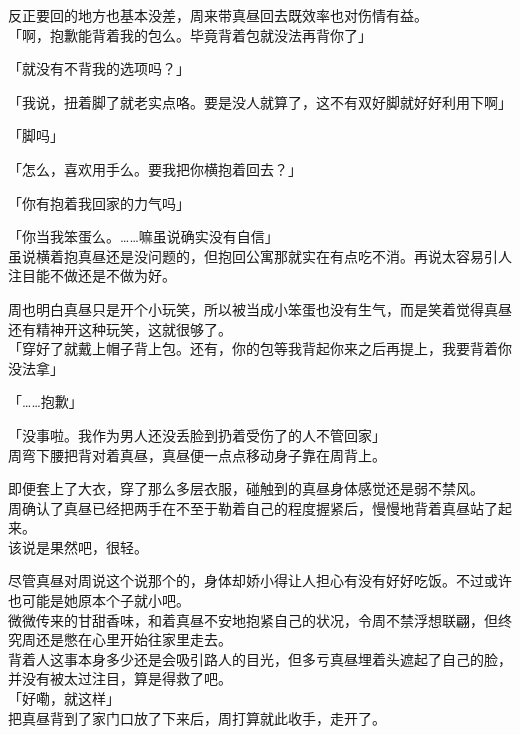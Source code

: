 反正要回的地方也基本没差，周来带真昼回去既效率也对伤情有益。\\

「啊，抱歉能背着我的包么。毕竟背着包就没法再背你了」

「就没有不背我的选项吗？」

「我说，扭着脚了就老实点咯。要是没人就算了，这不有双好脚就好好利用下啊」

「脚吗」

「怎么，喜欢用手么。要我把你横抱着回去？」

「你有抱着我回家的力气吗」

「你当我笨蛋么。……嘛虽说确实没有自信」\\

虽说横着抱真昼还是没问题的，但抱回公寓那就实在有点吃不消。再说太容易引人注目能不做还是不做为好。

周也明白真昼只是开个小玩笑，所以被当成小笨蛋也没有生气，而是笑着觉得真昼还有精神开这种玩笑，这就很够了。\\

「穿好了就戴上帽子背上包。还有，你的包等我背起你来之后再提上，我要背着你没法拿」

「……抱歉」

「没事啦。我作为男人还没丢脸到扔着受伤了的人不管回家」\\

周弯下腰把背对着真昼，真昼便一点点移动身子靠在周背上。

即便套上了大衣，穿了那么多层衣服，碰触到的真昼身体感觉还是弱不禁风。\\

周确认了真昼已经把两手在不至于勒着自己的程度握紧后，慢慢地背着真昼站了起来。\\

该说是果然吧，很轻。

尽管真昼对周说这个说那个的，身体却娇小得让人担心有没有好好吃饭。不过或许也可能是她原本个子就小吧。\\

微微传来的甘甜香味，和着真昼不安地抱紧自己的状况，令周不禁浮想联翩，但终究周还是憋在心里开始往家里走去。\\

背着人这事本身多少还是会吸引路人的目光，但多亏真昼埋着头遮起了自己的脸，并没有被太过注目，算是得救了吧。\\

「好嘞，就这样」\\

把真昼背到了家门口放了下来后，周打算就此收手，走开了。


